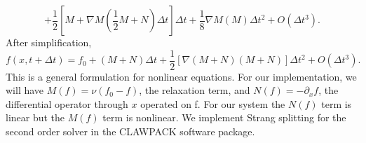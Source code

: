 \begin{equation*}
 + \frac{1}{2} \left[M + \nabla M(\frac{1}{2} M + N) \Delta t \right] \Delta t + \frac{1}{8} \nabla M(M) \Delta t^2 + O(\Delta t^3).
\end{equation*}
%
After simplification,
%
\begin{equation}
f(x,t+\Delta t) = f_0 + \left(M + N\right) \Delta t + \frac{1}{2} \left[ \nabla (M + N)(M + N) \right] \Delta t^2 + O(\Delta t^3).
\end{equation}
%
%
%
%
%
This is a general formulation for nonlinear equations. For our implementation, we will have $M(f) = \nu (f_0 - f)$, the relaxation term, and $N(f) = -\partial_x f$, the differential operator through $x$ operated on f. For our system the $N(f)$ term is linear but the $M(f)$ term is nonlinear. We implement Strang splitting for the second order solver in the CLAWPACK software package.
